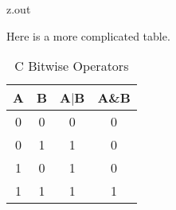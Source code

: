 \MyIOS


\begin{VerbatimOut}{z.out}

\newpage

Here is a more complicated table.

\begin{table}[ht]
  \caption{C Bitwise Operators}
  \vspace*{6pt}
  \centering
    \begin{tabular}{@{}cccc@{}}
      \toprule
      \bf A& \bf B& \bf A$|$B& \bf A\&B\\[2pt]
      \midrule
      0& 0& 0& 0\\
      0& 1& 1& 0\\
      1& 0& 1& 0\\
      1& 1& 1& 1\\
      \bottomrule
    \end{tabular}
  \label{ta:C-Bitwise}
\end{table}
\end{VerbatimOut}

\MyIOS


% 
% 
% 
% 


